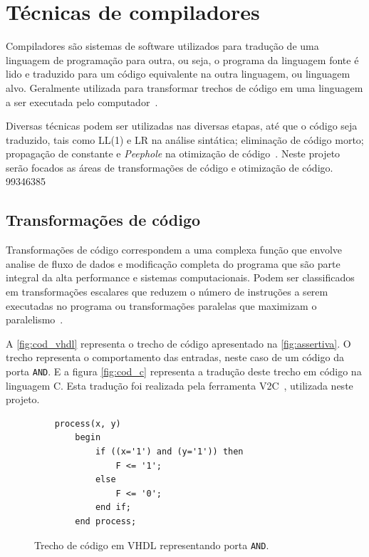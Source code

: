 \section{Técnicas de compiladores}
\par
Compiladores são sistemas de software utilizados para tradução de uma linguagem de programação para outra, ou seja, o programa da linguagem fonte é lido e traduzido para um código equivalente na outra linguagem, ou linguagem alvo. Geralmente utilizada para transformar trechos de código em uma linguagem a ser executada pelo computador~\cite{aho2007compilers}. 

\par
Diversas técnicas podem ser utilizadas nas diversas etapas, até que o código seja traduzido, tais como LL(1) e LR na análise sintática; eliminação de código morto; propagação de constante e \textit{Peephole} na otimização de código~\cite{aho2007compilers}. Neste projeto serão focados as áreas de transformações de código e otimização de código.
99346385
\subsection{Transformações de código}
\par
Transformações de código correspondem a uma complexa função que envolve analise de fluxo de dados e modificação completa do programa que são parte integral da alta performance e sistemas computacionais. Podem ser classificados em transformações escalares que reduzem o número de instruções a serem executadas no programa ou transformações paralelas que maximizam o paralelismo~\cite{srikant2002compiler}.

\par
A \autoref{fig:cod_vhdl} representa o trecho de código apresentado na \autoref{fig:assertiva}. O trecho representa o comportamento das entradas, neste caso de um código da porta \texttt{AND}. E a figura \autoref{fig:cod_c} representa a tradução deste trecho em código na linguagem C. Esta tradução foi realizada pela ferramenta V2C~\cite{albertoV2C}, utilizada neste projeto.

\begin{figure}[thp]
\caption{\label{fig:cod_vhdl} Trecho de código em VHDL representando porta \texttt{AND}.}
	\begin{center}
    \begin{minipage}{0.9\textwidth}
    \begin{lstlisting}       
	process(x, y)
    	begin
        	if ((x='1') and (y='1')) then
            	F <= '1';
        	else
            	F <= '0';
        	end if;
    	end process;
\end{lstlisting}
    \end{minipage}
	\end{center}
\end{figure}


